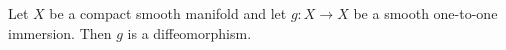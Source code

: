 Let $X$ be a compact smooth manifold and let $g: X \to X$ be a smooth one-to-one immersion. Then $g$ is a diffeomorphism.
